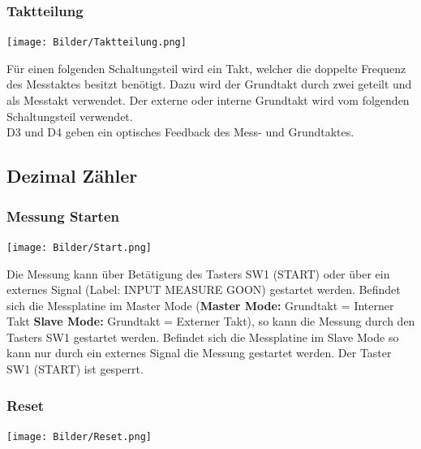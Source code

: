 \documentclass[a4paper,11pt]{scrartcl}
\begin{document}
\newpage

\subsubsection{Taktteilung}

\begin{center}
\texttt{[image: Bilder/Taktteilung.png]}
\end{center}

Für einen folgenden Schaltungsteil wird ein Takt, welcher die doppelte Frequenz des Messtaktes besitzt benötigt. Dazu wird der Grundtakt durch zwei geteilt und als Messtakt verwendet. Der externe oder interne Grundtakt wird vom folgenden Schaltungsteil verwendet.
\\
D3 und D4 geben ein optisches Feedback des Mess- und Grundtaktes. 


\subsection{Dezimal Zähler}

\subsubsection{Messung Starten}

\begin{center}
\texttt{[image: Bilder/Start.png]}
\end{center}

Die Messung kann über Betätigung des Tasters SW1 (START) oder über ein externes Signal (Label: INPUT MEASURE GOON) gestartet werden. Befindet sich die Messplatine im \glqq Master Mode \grqq{} (\textbf{Master Mode:}  Grundtakt = Interner Takt \textbf{Slave Mode:} Grundtakt = Externer Takt), so kann die Messung durch den Tasters SW1 gestartet werden. Befindet sich die Messplatine im \glqq Slave Mode \grqq{} so kann nur durch ein externes Signal die Messung gestartet werden. Der Taster SW1 (START) ist gesperrt.

\newpage
\subsubsection{Reset}

\begin{center}
\texttt{[image: Bilder/Reset.png]}
\end{center}
\end{document}
